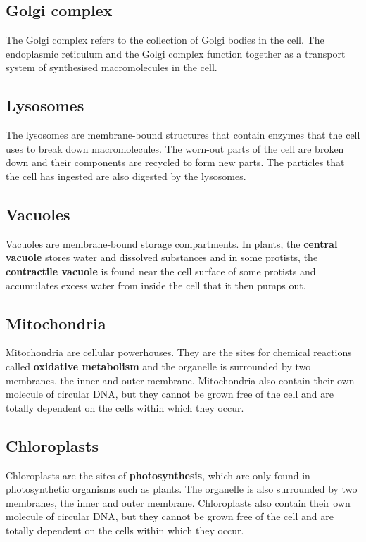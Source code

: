 \documentclass[11pt]{article}
\begin{document}
\subsection{Golgi complex}
\label{sec:orgc117996}
The Golgi complex refers to the collection of Golgi bodies in the cell. The endoplasmic reticulum and the Golgi complex function together as a transport system of synthesised macromolecules in the cell.

\subsection{Lysosomes}
\label{sec:org8d1aa84}
The lysosomes are membrane-bound structures that contain enzymes that the cell uses to break down macromolecules. The worn-out parts of the cell are broken down and their components are recycled to form new parts. The particles that the cell has ingested are also digested by the lysosomes.

\subsection{Vacuoles}
\label{sec:orgd0b5e78}
Vacuoles are membrane-bound storage compartments. In plants, the \textbf{central vacuole} stores water and dissolved substances and in some protists, the \textbf{contractile vacuole} is found near the cell surface of some protists and accumulates excess water from inside the cell that it then pumps out.

\subsection{Mitochondria}
\label{sec:org1e66a2a}
Mitochondria are cellular powerhouses. They are the sites for chemical reactions called \textbf{oxidative metabolism} and the organelle is surrounded by two membranes, the inner and outer membrane. Mitochondria also contain their own molecule of circular DNA, but they cannot be grown free of the cell and are totally dependent on the cells within which they occur.

\subsection{Chloroplasts}
\label{sec:orgd1d2e60}
Chloroplasts are the sites of \textbf{photosynthesis}, which are only found in photosynthetic organisms such as plants. The organelle is also surrounded by two membranes, the inner and outer membrane. Chloroplasts also contain their own molecule of circular DNA, but they cannot be grown free of the cell and are totally dependent on the cells within which they occur.
\end{document}
